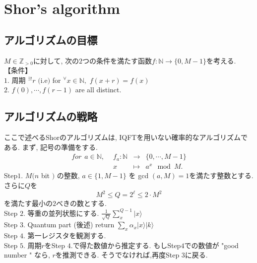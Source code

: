 \documentclass{jsarticle}
\theoremstyle{definition}
\begin{document}
\section{Shor's algorithm}
\subsection{アルゴリズムの目標}
$M \in \mathbb{Z}_{>0}$に対して, 次の$2$つの条件を満たす函数$f:\mathbb{N}\rightarrow \{0, M-1 \}$を考える.\\
【条件】\\
$1.$ 周期 $^{\exists !}r$	$($i.e$)$ for $^{\forall} x \in \mathbb{N}, $ $f(x+r)=f(x)$\\
$2.$ $f(0), \cdots , f(r-1)$ are all distinct. 

\subsection{アルゴリズムの戦略}
ここで述べるShorのアルゴリズムは, IQFTを用いない確率的なアルゴリズムである. 
まず, 記号の準備をする.
\begin{equation}
 \begin{array}{crcc}
for \hspace{5pt}a \in \mathbb{N}, \hspace{5pt} & f_a:\mathbb{N} &\rightarrow& \{ 0, \cdots , M-1 \} \\
 &x &\mapsto& a^x \mod M.
 \end{array}
 \end{equation}
Step$1.$ $M ( n$  bit $)$ の整数,  $a \in \{1, M-1 \}$ を gcd $(a, M)=1$を満たす整数とする. さらに$Q$を
\begin{equation}\label{M_condition}
M^2 \leq Q =2^{\ell} \leq 2\cdot M^2
\end{equation}
を満たす最小の$2べきの数とする.$ \\
Step $2.$ 等重の並列状態にする. $\frac{1}{\sqrt{Q} } \displaystyle\sum_{x}^{Q-1}  |x  \rangle$ \\
Step $3.$ Quantum part (後述)  return $\displaystyle\sum_x\alpha_x |x \rangle | k \rangle $\\
Step $4.$ 第一レジスタを観測する. \\
Step $5.$ 周期$r$をStep $4.$で得た数値から推定する. もしStep$4$での数値が "good number " なら, $r$を推測できる. そうでなければ,再度Step $3$に戻る.\\
\end{document}
